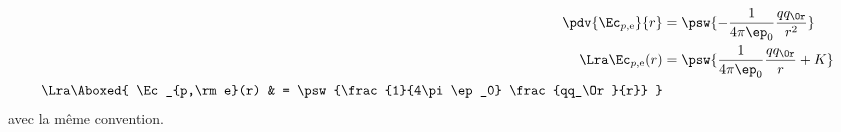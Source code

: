 \documentclass[../../main/main.tex]{subfiles}
\begin{document}
\begin{tcb*}
\begin{itemize}
		      \smallbreak
		      \begin{minipage}{0.45\linewidth}
			      \begin{align*}
				      \pdv{\Ec_{p,\rm e}}{r}
				       & =
				      \psw{-\frac{1}{4\pi\ep_0} \frac{qq_\Or}{r^2}}
				      \\\Lra
				      \Ec_{p,\rm e}(r)
				       & =
				      \psw{\frac{1}{4\pi\ep_0} \frac{qq_\Or}{r} + K}
				      \\\Lra
				      \Aboxed{
					      \Ec_{p,\rm e}(r)
				       & =
					      \psw{\frac{1}{4\pi\ep_0} \frac{qq_\Or}{r}}
				      }
			      \end{align*}
			      avec la même convention.
		      \end{minipage}
		      \hfill
		      \begin{minipage}{0.45\linewidth}
			      \begin{center}
				      \vspace{-15pt}
			      \end{center}
		      \end{minipage}
	\end{itemize}
	\vspace{-15pt}
\end{tcb*}
\vspace*{-15pt}
\end{document}
